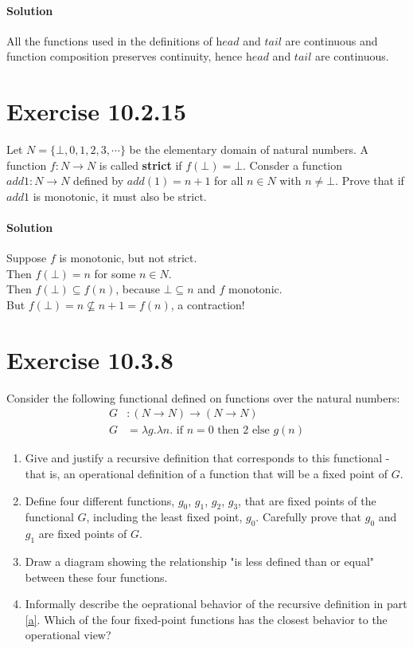 \documentclass{article}[12pt]
\newcommand{\head}{\ensuremath{\textit{head}}}
\newcommand{\tail}{\ensuremath{\textit{tail}}}
\newcommand{\myif}{\ensuremath{\text{ if }}}
\newcommand{\then}{\ensuremath{\text{ then }}}
\newcommand{\myelse}{\ensuremath{\text{ else }}}
\begin{document}
\paragraph{Solution}
All the functions used in the definitions of $\head$
and $\tail$ are continuous and function composition
preserves continuity, hence $\head$ and $\tail$ are continuous.

\section{Exercise 10.2.15}
Let $N = \{\bot,0,1,2,3,\cdots\}$ be the elementary domain of natural numbers.
A function $f: N \rightarrow N$ is called \textbf{strict} if $f(\bot) = \bot$.
Consder a function $add1 : N \rightarrow N$ defined by $add(1) = n + 1$ for all $n \in N$ with $n \neq \bot$.
Prove that if $add1$ is monotonic, it must also be strict.

\paragraph{Solution}

Suppose $f$ is monotonic, but not strict.\\
Then $f(\bot) = n$ for some $n \in N$.\\
Then $f(\bot) \subseteq f(n)$, because $\bot \subseteq n$ and $f$ monotonic.\\
But $f(\bot) = n \not\subseteq n+1 = f(n)$, a contraction!

\section{Exercise 10.3.8}
Consider the following functional defined on functions over the natural numbers:
\begin{align*}
    G &: (N \rightarrow N) \rightarrow (N \rightarrow N)\\
    G &= \lambda g. \lambda n.\myif n = 0 \then 2 \myelse g(n)
\end{align*}
\begin{enumerate}[label=\alph*)]
    \item \label{a} Give and justify a recursive definition that corresponds to this functional -
    that is, an operational definition of a function that will be a fixed point of $G$.
    \item Define four different functions, $g_0$, $g_1$, $g_2$, $g_3$, that are fixed
    points of the functional $G$, including the least fixed point, $g_0$. Carefully
    prove that $g_0$ and $g_1$ are fixed points of $G$.
    \item Draw a diagram showing the relationship "is less defined than or equal" between
    these four functions.
    \item Informally describe the oeprational behavior of the recursive definition in part \ref{a}.
    Which of the four fixed-point functions has the closest behavior to the operational view?
\end{enumerate}
\end{document}
